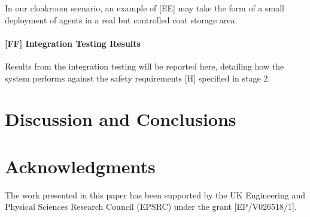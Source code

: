 \documentclass[lettersize,journal]{IEEEtran}
\begin{document}
In our cloakroom scenario, an example of [EE] may take the form of a small deployment of agents in a real but controlled coat storage area.




\paragraph*{[FF] Integration Testing Results}

Results from the integration testing will be reported here, detailing how the system performs against the safety requirements [H] specified in stage 2.

	
\section{Discussion and Conclusions} \label{discussion-conclusions}

\section*{Acknowledgments}
The work presented in this paper has been supported by the UK Engineering and Physical Sciences Research Council (EPSRC) under the grant [EP/V026518/1].
\end{document}
